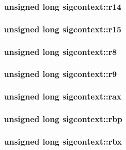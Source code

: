 \subsubsection[{r14}]{\setlength{\rightskip}{0pt plus 5cm}unsigned long {\bf sigcontext::r14}}\label{structsigcontext_a27583993c77bb5ff8ff8d15406bcbbfb}
\subsubsection[{r15}]{\setlength{\rightskip}{0pt plus 5cm}unsigned long {\bf sigcontext::r15}}\label{structsigcontext_a5d46d19c36cc5af89aeb961185fcdf01}
\subsubsection[{r8}]{\setlength{\rightskip}{0pt plus 5cm}unsigned long {\bf sigcontext::r8}}\label{structsigcontext_ac65aa16a94677191a30e88a059d6265b}
\subsubsection[{r9}]{\setlength{\rightskip}{0pt plus 5cm}unsigned long {\bf sigcontext::r9}}\label{structsigcontext_a0f4cf2ea03e9c57f84875a3973a80f0c}
\subsubsection[{rax}]{\setlength{\rightskip}{0pt plus 5cm}unsigned long {\bf sigcontext::rax}}\label{structsigcontext_a091cb9643cb5c3e722d52ca6196d2511}
\subsubsection[{rbp}]{\setlength{\rightskip}{0pt plus 5cm}unsigned long {\bf sigcontext::rbp}}\label{structsigcontext_aecd5daf47126cec324b162cffb12ec9f}
\subsubsection[{rbx}]{\setlength{\rightskip}{0pt plus 5cm}unsigned long {\bf sigcontext::rbx}}\label{structsigcontext_a1e3c73a4be773ac5520a6b75c98cfe1e}
